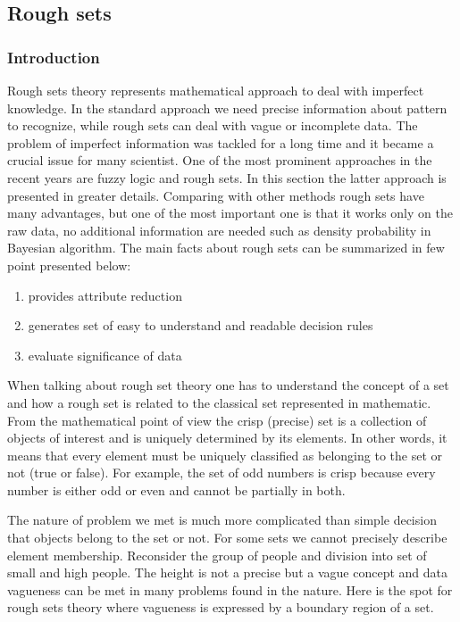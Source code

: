 \subsection{Rough sets}
\label{cha:Rough_set}
\subsubsection{Introduction}
\label{cha:Rough_set_introduction}
Rough sets theory represents mathematical approach to deal with imperfect knowledge. 
In the standard approach we need precise information about pattern to recognize, 
while rough sets can deal with vague or incomplete data. The problem of imperfect 
information was tackled for a long time and it became a crucial issue for many scientist.
One of the most prominent approaches in the recent years are fuzzy logic and rough sets.
In this section the latter approach is presented in greater details. Comparing with 
other methods rough sets have many advantages, but one of the most important
one is that it works only on the raw data, no additional information are needed such 
as density probability in Bayesian algorithm. The main facts about rough sets can be 
summarized in few point presented below:
\begin{enumerate}
    \item provides attribute reduction
    \item generates set of easy to understand and readable decision
         rules
    \item evaluate significance of data 
\end{enumerate}

When talking about rough set theory one has to understand the concept of a set 
and how a rough set is related to the classical set represented in mathematic.
From the mathematical point of view the crisp (precise) set is a collection of 
objects of interest and is uniquely determined by its elements. In other words,
it means that every element must be uniquely classified as belonging to the set 
or not (true or false). For example, the set of odd numbers is crisp because every
number is either odd or even and cannot be partially in both. 

The nature of problem we met is much more complicated than simple decision that
objects belong to the set or not. For some sets we cannot precisely describe element
membership. Reconsider the group of people and division into set of small and
high people. The height is not a precise but a vague concept and data vagueness can 
be met in many problems found in the nature. Here is the spot for rough sets
theory where vagueness is expressed by a boundary region of a set. 

